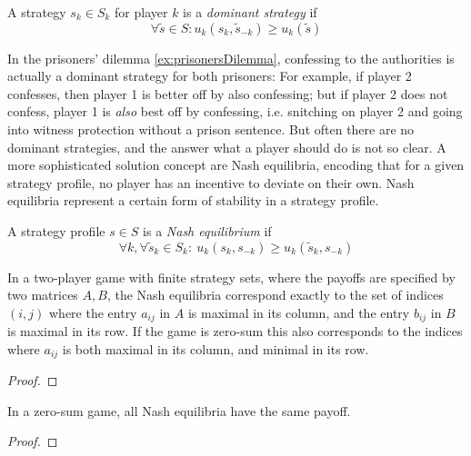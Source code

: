 \documentclass[a4paper]{scrreprt}
\begin{document}
    \begin{defn}
        A strategy $s_k \in S_k$ for player $k$ is a \emph{dominant strategy} if 
        \[ \forall \tilde{s} \in S: u_k(s_k, \tilde{s}_{-k}) \geq u_k(\tilde{s}) \]
    \end{defn}
    
    In the prisoners' dilemma \ref{ex:prisonersDilemma}, confessing to the authorities is actually a dominant strategy for both prisoners:
    For example, if player 2 confesses, then player 1 is better off by also confessing; but if player 2 does not confess, player 1 is \emph{also} best off by confessing, i.e. snitching on player 2 and going into witness protection without a prison sentence.
    But often there are no dominant strategies, and the answer what a player should do is not so clear.
    A more sophisticated solution concept are Nash equilibria, encoding that for a given strategy profile, no player has an incentive to deviate on their own. Nash equilibria represent a certain form of stability in a strategy profile.
    
    \begin{defn}
        A strategy profile $s \in S$ is a \emph{Nash equilibrium} if
        \[
            \forall k, \forall \tilde{s}_k \in S_k:~ u_k(s_k, s_{-k}) \geq u_k(\tilde{s}_k, s_{-k})
        \]
        \label{def:nashEquilibriumRealValued}
    \end{defn}
    
    \begin{lemma} 
        In a two-player game with finite strategy sets, where the payoffs are specified by two matrices $A, B$, the Nash equilibria correspond
        exactly to the set of indices $(i, j)$ where the entry $a_{ij}$ in $A$ is maximal in its column, and the entry $b_{ij}$ in $B$ is maximal in its row.
        If the game is zero-sum this also corresponds to the indices where $a_{ij}$ is both maximal in its column, and minimal in its row.
    \end{lemma}
    \begin{proof}
    \end{proof}


    \begin{lemma}
        In a zero-sum game, all Nash equilibria have the same payoff.
    \end{lemma}
    \begin{proof}
    \end{proof}
    
\end{document}
